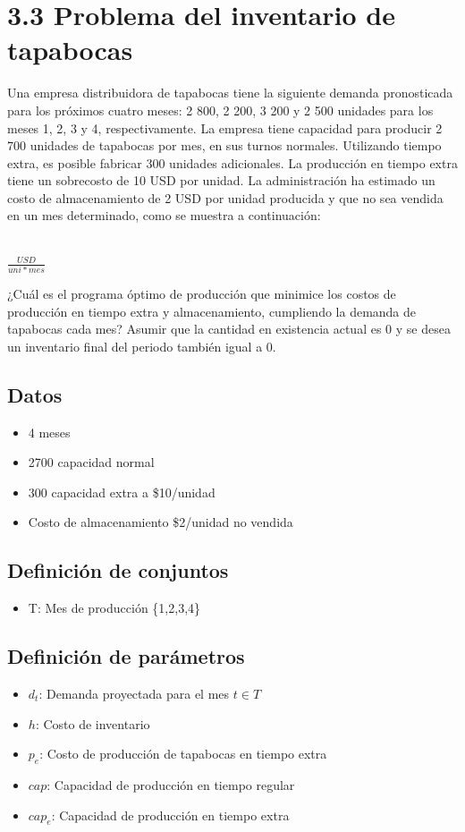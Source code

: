 \documentclass{article}
\begin{document}
\newpage
\section*{3.3 Problema del inventario de tapabocas}

Una empresa distribuidora de tapabocas tiene la siguiente demanda
pronosticada para los próximos cuatro meses: 2 800, 2 200, 3 200 y 2 500 unidades
para los meses 1, 2, 3 y 4, respectivamente. La empresa tiene capacidad
para producir 2 700 unidades de tapabocas por mes, en sus turnos normales.
Utilizando tiempo extra, es posible fabricar 300 unidades adicionales. La
producción en tiempo extra tiene un sobrecosto de 10 USD por unidad. \bigskip
La administración ha estimado un costo de almacenamiento de 2 USD por
unidad producida y que no sea vendida en un mes determinado, como se
muestra a continuación: \\\\
\begin{center}
    $\frac{USD}{uni*mes} $
\end{center}
¿Cuál es el programa óptimo de producción que minimice los costos de
producción en tiempo extra y almacenamiento, cumpliendo la demanda de
tapabocas cada mes? Asumir que la cantidad en existencia actual es 0 y se
desea un inventario final del periodo también igual a 0.

\subsection*{Datos}
\begin{itemize}
    \item 4 meses
    \item 2700 capacidad normal
    \item 300 capacidad extra a \$10/unidad
    \item Costo de almacenamiento \$2/unidad no vendida
\end{itemize}

\subsection*{Definición de conjuntos}
\begin{itemize}
    \item T: Mes de producción \{1,2,3,4\}
\end{itemize}

\subsection*{Definición de parámetros}
\begin{itemize}
    \item $d_t$: Demanda proyectada para el mes $t \in T$
    \item $h$: Costo de inventario
    \item $p_e$: Costo de producción de tapabocas en tiempo extra
    \item $cap$: Capacidad de producción en tiempo regular
    \item $cap_e$: Capacidad de producción en tiempo extra
\end{itemize}
\end{document}
